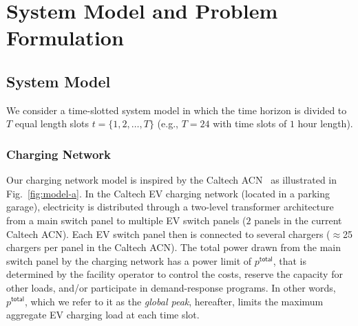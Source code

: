 \documentclass[journal]{IEEEtran}
\newcommand{\rev}[1]{{\color{black}#1}}%
\newcommand{\rev}[1]{#1}
\begin{document}
\section{System Model and Problem Formulation}
		\label{sec:model}
		
		
		
		\subsection{System Model}
		We consider a time-slotted system model in which the time horizon is divided to $T$ equal length slots ${t=\{1, 2, \dots ,T\}}$ (e.g., $T=24$ with time slots of $1$ hour length).
\subsubsection{Charging Network}
\label{sec:acn}
Our charging network model is inspired by the Caltech ACN~\cite{lee2016adaptive} as illustrated in Fig.~\ref{fig:model-a}. In \rev{the} Caltech EV charging network (located in a parking garage), electricity is distributed through a two-level transformer architecture from a main switch panel to multiple EV switch panels (\rev{$2$} panels in the current Caltech ACN). Each EV switch panel then is connected to several chargers ($\approx$25 chargers \rev{per panel} in the Caltech ACN). The total power drawn from the main switch panel \rev{by} the charging network has a power limit of  $p^\mathsf{total}$, that is determined by the facility operator to control the costs, reserve the capacity for other loads, and/or participate in demand-response programs.  
In other words, $p^\mathsf{total}$, which we refer to it as the \textit{global peak}, hereafter, limits the maximum aggregate EV charging load at each time slot. 
\end{document}
